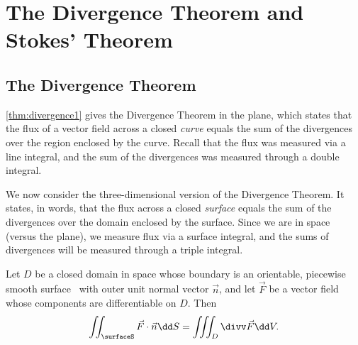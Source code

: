 \section{The Divergence Theorem and Stokes' Theorem}\label{sec:stokes_divergence}

\subsection{The Divergence Theorem}

\autoref{thm:divergence1} gives the Divergence Theorem in the plane, which states that the flux of a vector field across a closed \emph{curve} equals the sum of the divergences over the region enclosed by the curve. Recall that the flux was measured via a line integral, and the sum of the divergences was measured through a double integral.

We now consider the three-dimensional version of the Divergence Theorem. It states, in words, that the flux across a closed \emph{surface} equals the sum of the divergences over the domain enclosed by the surface. Since we are in space (versus the plane), we measure flux via a surface integral, and the sums of divergences will be measured through a triple integral.


\begin{theorem}\label{thm:divergence2}
Let $D$ be a closed domain in space whose boundary is an orientable, piecewise smooth surface \surfaceS\ with outer unit normal vector $\vec n$, and let $\vec F$ be a vector field whose components are differentiable on $D$. Then
\[\iint_\surfaceS \vec F\cdot\vec n\dd S =\iiint_D \divv \vec F\dd V.\]
\end{theorem}



